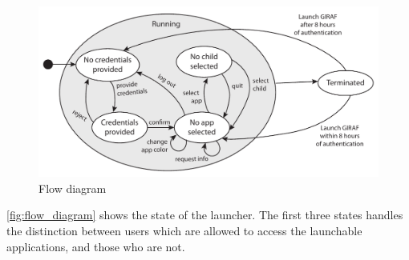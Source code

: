 \begin{figure}[h]
	\centering
	\includegraphics[width=1\textwidth]{gfx/statediagram.pdf}
	\caption{Flow diagram}
	\label{fig:flow_diagram}
\end{figure}

\autoref{fig:flow_diagram} shows the state of the launcher. The first three states handles the distinction between users which are allowed to access the launchable applications, and those who are not. 

